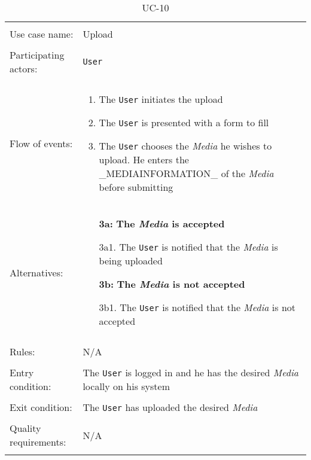 \noindent
\begin{table}[h!]
\caption{UC-10}
\label{UC-10}
\begin{tabular}{ l p{8cm} } 
\hline  
\\                   
Use case name:  & Upload   \\   \hline \\               
Participating actors:  & \texttt{User} \\   \hline \\         
Flow of events: & \begin{enumerate}
\item{The \texttt{User} initiates the upload}
\item{The \texttt{User} is presented with a form to fill}
\item{The \texttt{User} chooses the \textit{Media} he wishes to upload. He enters the \_MEDIAINFORMATION\_ of the \textit{Media} before submitting}
\end{enumerate} \\
Alternatives: & \begin{itemize}
\item[\textbf{3a:}] \textbf{The \textit{Media} is accepted}
\item[]  3a1. The \texttt{User} is notified that the \textit{Media} is being uploaded
\item[\textbf{3b:}] \textbf{The \textit{Media} is not accepted}
\item[]  3b1. The \texttt{User} is notified that the \textit{Media} is not accepted
\end{itemize}
\\   \hline \\
Rules: & N/A \\ \hline \\
Entry condition: & The \texttt{User} is logged in and he has the desired \textit{Media} locally on his system \\ \hline \\
Exit condition: & The \texttt{User} has uploaded the desired \textit{Media} \\ \hline \\
Quality requirements: & N/A \\ \hline \\
\end{tabular} \\
\end{table}

